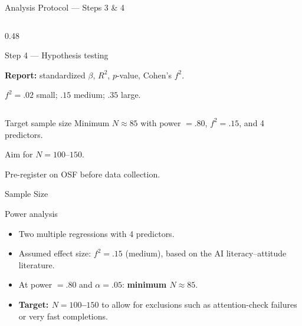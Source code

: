 \documentclass[10pt,aspectratio=169]{beamer}
\begin{document}
\begin{frame}{Analysis Protocol --- Steps 3 \& 4}
\begin{columns}[T,onlytextwidth]
\begin{column}{0.48\textwidth}
\begin{block}{Step 4 --- Hypothesis testing}
      \medskip

      \textbf{Report:} standardized $\beta$, $R^2$, $p$-value, Cohen's $f^2$.

      \medskip

      $f^2 = .02$ small; $.15$ medium; $.35$ large.

    \end{block}
  \end{column}

\end{columns}

\vspace{0.3em}

\begin{exampleblock}{Target sample size}
\scriptsize
Minimum $N \approx 85$ with power $= .80$, $f^2 = .15$, and 4 predictors.

Aim for $N = 100$--$150$.

Pre-register on OSF before data collection.
\end{exampleblock}

\end{frame}

\begin{frame}[t]{Sample Size}
\footnotesize

\begin{block}{Power analysis}
\vspace{-0.3em}
\begin{itemize}
  \setlength\itemsep{0.2em}

  \item Two multiple regressions with 4 predictors.

  \item Assumed effect size: $f^2 = .15$ (medium), based on the
  AI literacy--attitude literature.

  \item At power $= .80$ and $\alpha = .05$: 
  \textbf{minimum $N \approx 85$}.

  \item \textbf{Target: $N = 100$--$150$} to allow for exclusions
  such as attention-check failures or very fast completions.

\end{itemize}
\vspace{-0.4em}
\end{block}

\vspace{-0.25em}

\end{frame}
\end{document}
